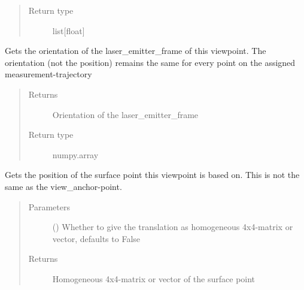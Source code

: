 \documentclass[letterpaper,10pt,english]{sphinxmanual}
\begin{document}
\begin{fulllineitems}
\begin{fulllineitems}
\begin{quote}
\begin{description}
\item[{Return type}] \leavevmode
list{[}float{]}

\end{description}\end{quote}

\end{fulllineitems}


\begin{fulllineitems}
\label{\detokenize{module_view:agiprobot_measurement.viewpoint.ViewPoint.get_orientation_matrix}}
Gets the orientation of the laser\_emitter\_frame of this viewpoint. The orientation (not the position) remains the same for every point on the assigned measurement-trajectory
\begin{quote}\begin{description}
\item[{Returns}] \leavevmode
Orientation of the laser\_emitter\_frame

\item[{Return type}] \leavevmode
numpy.array

\end{description}\end{quote}

\end{fulllineitems}


\begin{fulllineitems}
\label{\detokenize{module_view:agiprobot_measurement.viewpoint.ViewPoint.get_surface_point}}
Gets the position of the surface point this viewpoint is based on. This is not the same as the view\_anchor-point.
\begin{quote}\begin{description}
\item[{Parameters}] \leavevmode
{} (\sphinxstyleliteralemphasis{, }) \textendash{} Whether to give the translation as homogeneous 4x4-matrix or vector, defaults to False

\item[{Returns}] \leavevmode
Homogeneous 4x4-matrix or vector of the surface point


\end{description}
\end{quote}
\end{fulllineitems}
\end{fulllineitems}
\end{document}
